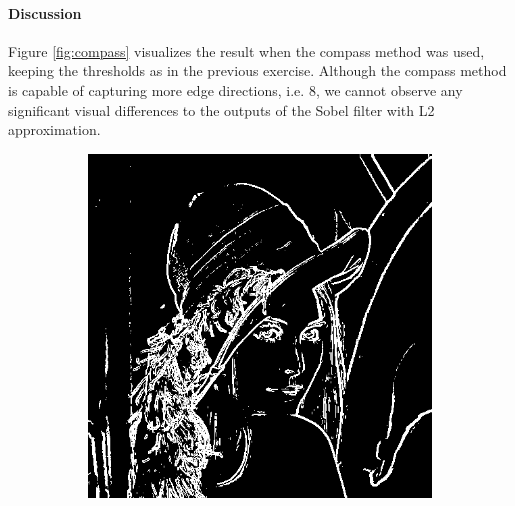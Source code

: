 \documentclass{article}
\begin{document}
\paragraph{Discussion}
Figure \ref{fig:compass} visualizes the result when the compass method was used, keeping the thresholds as in the previous exercise. Although the compass method is capable of capturing more edge directions, i.e. $8$, we cannot observe any significant visual differences to the outputs of the Sobel filter with L2 approximation. 
\begin{figure}
        \centering
        \begin{subfigure}[b]{0.32\textwidth}
            \includegraphics[width=\textwidth]{Images/lena_compass.png}
        \end{subfigure}
        \hfill
        \begin{subfigure}[b]{0.32\textwidth}

\end{subfigure}
\end{figure}
\end{document}
